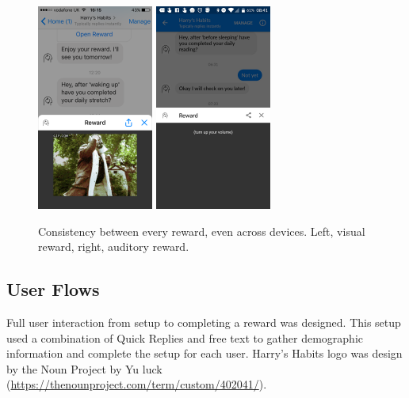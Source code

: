 \begin{figure}[H]
  \centering
  \includegraphics[width=1.5in]{../resources/design/reward-visual-2.png}
  \hspace{10px}
  \includegraphics[width=1.5in]{../resources/design/reward-audio.png}
  \caption{Consistency between every reward, even across devices. Left, visual reward, right, auditory reward.}
  \label{fig:rewards_consistency}
\end{figure}



\newpage


\subsection{User Flows} \label{user_flow}
Full user interaction from setup to completing a reward was designed. This setup used a combination of Quick Replies and free text to gather demographic information and complete the setup for each user. Harry's Habits logo was design by the Noun Project by Yu luck (\url{https://thenounproject.com/term/custom/402041/}).

